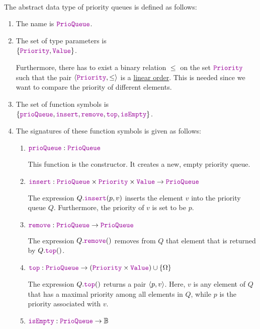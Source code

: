 \begin{Definition}  \hspace*{\fill} \\
  The abstract data type of priority queues is defined as follows:
  \begin{enumerate}
  \item The name is $\mytt{PrioQueue}$.
  \item The set of type parameters is \\[0.1cm]
        \hspace*{1.3cm} $\{ \mytt{Priority}, \mytt{Value} \}$.

        Furthermore, there has to exist a binary relation $\leq$ on the set $\mytt{Priority}$ such that
        the pair $\langle \mytt{Priority}, \leq \rangle$ is a \hyperref[def:linear_order]{linear order}.
        This is needed since we want to compare the priority of different elements.
  \item The set of function symbols is \\[0.1cm]
       \hspace*{1.3cm} 
       $\{ \mytt{prioQueue}, \mytt{insert}, \mytt{remove}, \mytt{top}, \mytt{isEmpty} \}$.
  \item The signatures of these function symbols is given as follows:
        \begin{enumerate}
        \item $\mytt{prioQueue}: \mytt{PrioQueue}$

              This function is the constructor. It creates a new, empty priority queue.
        \item $\mytt{insert}: \mytt{PrioQueue} \times \mytt{Priority} \times \mytt{Value} \rightarrow \mytt{PrioQueue}$

              The expression $Q.\mytt{insert}(p,v)$ inserts the  element $v$ into the priority queue $Q$.
              Furthermore, the priority of $v$ is set to be $p$.
        \item $\mytt{remove}: \mytt{PrioQueue} \rightarrow \mytt{PrioQueue}$

              The expression $Q.\mytt{remove}()$ removes from $Q$ that element that is returned by
              $Q.\mytt{top}()$.
        \item $\mytt{top}: \mytt{PrioQueue}  \rightarrow (\mytt{Priority} \times \mytt{Value}) \cup \{\Omega\}$

              The expression $Q.\mytt{top}()$ returns a pair $\pair(p,v)$.  Here,  $v$ is any
              element of $Q$ that has a  maximal priority among all elements in $Q$, while $p$ is
              the priority associated with $v$. 
        \item $\mytt{isEmpty}: \mytt{PrioQueue} \rightarrow \mathbb{B}$


\end{enumerate}
\end{enumerate}
\end{Definition}
